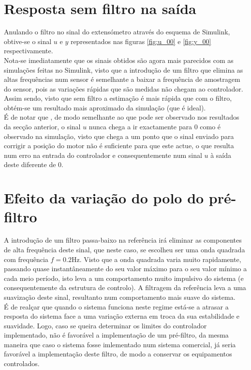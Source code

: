 \documentclass[%
  reprint,
  nofootinbib,
  amsmath,amssymb,
  aps,
  10pt,
  a4paper
]{revtex4-1}
\begin{document}
\section{Resposta sem filtro na saída}
Anulando o filtro no sinal do extensómetro através do esquema de Simulink, obtive-se o sinal $u$ e $y$ representados nas figuras \ref{fig:u_00} e \ref{fig:y_00} respectivamente.\\
Nota-se imediatamente que os sinais obtidos são agora mais parecidos com as simulações feitas no Simulink, visto que a introdução de um filtro que elimina as altas frequências num sensor é semelhante a baixar a frequência de amostragem do sensor, pois as variações rápidas que são medidas não chegam ao controlador. Assim sendo, visto que sem filtro a estimação é mais rápida que com o filtro, obtém-se um resultado mais aproximado da simulação (que é ideal).\\
É de notar que , de modo semelhante ao que pode ser observado nos resultados da secção anterior, o sinal $u$ nunca chega a ir exactamente para 0 como é observado na simulação, visto que chega a um ponto que o sinal enviado para corrigir a posição do motor não é suficiente para que este actue, o que resulta num erro na entrada do controlador e consequentemente num sinal $u$ à saída deste diferente de 0.

\section{Efeito da variação do polo do pré-filtro}
A introdução de um filtro passa-baixo na referência irá eliminar as componentes de alta frequência deste sinal, que neste caso, se escolheu ser uma onda quadrada com frequência $f=0.2$Hz. Visto que a onda quadrada varia muito rapidamente, passando quase instantâneamente do seu valor máximo para o seu valor mínimo a cada meio período, isto leva a um comportamento muito impulsivo do sistema (e consequentemente da estrutura de controlo). A filtragem da referência leva a uma suavização deste sinal, resultanto num comportamento mais suave do sistema.\\
É de realçar que quando o sistema funciona neste regime está-se a atrasar a resposta do sistema face a uma variação externa em troca da sua estabilidade e suavidade. Logo, caso se queira determinar os limites do controlador implementado, não é favorável a implementação de um pré-filtro, da mesma maneira que caso o sistema fosse imlementado num sistema comercial, já seria favorável a implementação deste filtro, de modo a conservar os equipamentos controlados.
\end{document}
